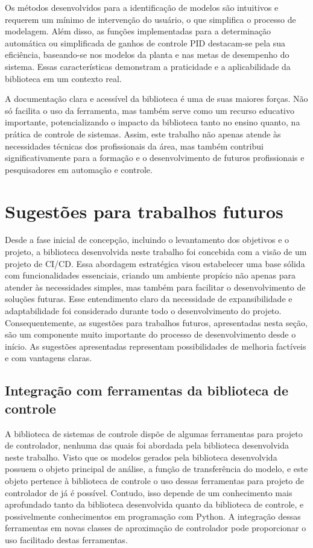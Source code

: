 Os métodos desenvolvidos para a identificação de modelos são intuitivos e requerem um mínimo de intervenção do usuário,
o que simplifica o processo de modelagem.
Além disso, as funções implementadas para a determinação automática ou simplificada de ganhos de controle PID
destacam-se pela sua eficiência, baseando-se nos modelos da planta e nas metas de desempenho do sistema.
Essas características demonstram a praticidade e a aplicabilidade da biblioteca em um contexto real.

A documentação clara e acessível da biblioteca é uma de suas maiores forças.
Não só facilita o uso da ferramenta, mas também serve como um recurso educativo importante, potencializando o impacto da biblioteca tanto no ensino quanto, na prática de controle de sistemas.
Assim, este trabalho não apenas atende às necessidades técnicas dos profissionais da área, mas também contribui
significativamente para a formação e o desenvolvimento de futuros profissionais e pesquisadores em automação e controle.

\section{Sugestões para trabalhos futuros}

Desde a fase inicial de concepção, incluindo o levantamento dos objetivos e o projeto, a biblioteca desenvolvida neste
trabalho foi concebida com a visão de um projeto de CI/CD.
Essa abordagem estratégica visou estabelecer uma base sólida com funcionalidades essenciais, criando um ambiente
propício não apenas para atender às necessidades simples, mas também para facilitar o desenvolvimento de soluções
futuras.
Esse entendimento claro da necessidade de expansibilidade e adaptabilidade foi considerado durante todo o
desenvolvimento do projeto.
Consequentemente, as sugestões para trabalhos futuros, apresentadas nesta seção, são um componente muito importante
do processo de desenvolvimento desde o início.
As sugestões apresentadas representam possibilidades de melhoria factíveis e com vantagens claras.

\subsection{Integração com ferramentas da biblioteca de controle}
A biblioteca de sistemas de controle dispõe de algumas ferramentas para projeto de controlador, nenhuma das quais foi
abordada pela biblioteca desenvolvida neste trabalho.
Visto que os modelos gerados pela biblioteca desenvolvida possuem o objeto principal de análise, a função de
transferência do modelo, e este objeto pertence à biblioteca de controle o uso dessas ferramentas para projeto de
controlador de já é possível.
Contudo, isso depende de um conhecimento mais aprofundado tanto da biblioteca desenvolvida quanto da biblioteca de
controle, e possivelmente conhecimentos em programação com Python.
A integração dessas ferramentas em novas classes de aproximação de controlador pode proporcionar o uso facilitado destas
ferramentas.

